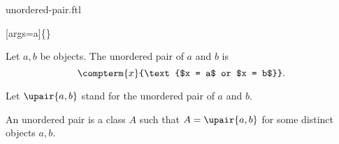 \documentclass{article}
\begin{document}
\begin{smodule}[creators={Marcel Schütz}]{unordered-pair.ftl}

  [args=a]{\comp\{\comp\}}

  \begin{fdefinition*}[label=3471035364016128]
    Let $a, b$ be objects.
    The unordered pair of $a$ and $b$ is
    \[\compterm{x}{\text{$x = a$ or $x = b$}}.\]
  \end{fdefinition*}

  \begin{fconvention*}
    Let $\upair{a,b}$ stand for the unordered pair of $a$ and $b$.
  \end{fconvention*}

  \begin{fdefinition*}[label=605432672419840]
    An unordered pair is a class $A$ such that $A = \upair{a,b}$ for some distinct objects $a, b$.
  \end{fdefinition*}
\end{smodule}
\end{document}
